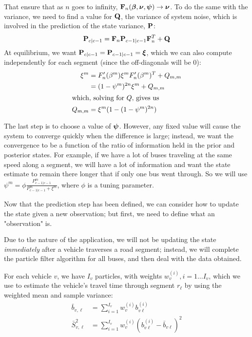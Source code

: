 \documentclass[draftcls,a4paper,onecolumn]{IEEEtran}\usepackage[]{graphicx}\usepackage[]{color}
\begin{document}
That ensure that as $n$ goes to infinity, $\mathbf{F}_n(\boldsymbol{\beta}, \boldsymbol{\nu}, \boldsymbol{\psi}) \to \boldsymbol{\nu}$.
To do the same with the variance, we need to find a value for $\mathbf{Q}$,
the variance of system noise, which is involved in the prediction of the state variance, $\mathbf{P}$:
\begin{equation}
  \label{eq:kf_varpred}
  \mathbf{P}_{c|c-1} = \mathbf{F}_n \mathbf{P}_{c-1|c-1}\mathbf{F}_n^T + \mathbf{Q} 
\end{equation}
At equilibrium, we want $\mathbf{P}_{c|c-1} = \mathbf{P}_{c-1|c-1} = \boldsymbol{\xi}$,
which we can also compute independently for each segment (since the off-diagonals will be 0):
\begin{align}
  \xi^m &= F'_n(\beta^m) \xi^m F'_n(\beta^m)^T + Q_{m,m}\\
    &= (1-\psi^m)^{2n} \xi^m + Q_{m,m} \nonumber \\
  \intertext{which, solving for $Q$, gives us}
  Q_{m,m} &= \xi^m(1 - (1 - \psi^m)^{2n})
\end{align}

The last step is to choose a value of $\boldsymbol{\psi}$.
However, any fixed value will cause the system to converge quickly when the difference is large;
instead, we want the convergence to be a function of the ratio of information held
in the prior and posterior states. 
For example, if we have a lot of buses traveling at the same speed along a segment, 
we will have a lot of information and want the state estimate to remain there
longer that if only one bus went through. 
So we will use $\psi^m = \phi \frac{P^m_{c-1|c-1}}{P^m_{c-1|c-1} + \xi^m}$,
where $\phi$ is a tuning parameter.


Now that the prediction step has been defined,
we can consider how to update the state given a new observation;
but first, we need to define what an "observation" is.

Due to the nature of the application,
we will not be updating the state \emph{immediately} after a vehicle
traverses a road segment;
instead, we will complete the particle filter algorithm for all buses,
and then deal with the data obtained.


For each vehicle $v$, we have $I_v$ particles,
with weights $w_v^{(i)}, i=1\ldots I_v$, which we use to
estimate the vehicle's travel time through segment $r_\ell$
by using the weighted mean and sample variance:
\begin{align}
  \label{eq:weighted_travel}
  \bar b_{v,\ell} &= \sum_{i=1}^{I_v} w_v^{(i)} b_{v\ell}^{(i)} \\
  \bar S_{v,\ell}^2 &= \sum_{i=1}^{I_v} w_v^{(i)}(b_{v\ell}^{(i)} - \bar b_{v\ell})^2
\end{align}
\end{document}
